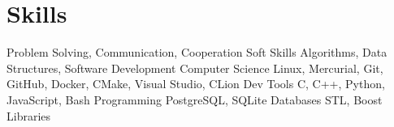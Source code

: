\section{Skills}

\begin{cventries}
    \cventryii
        {Problem Solving, Communication, Cooperation}
        {Soft Skills}
    \cventryii
        {Algorithms, Data Structures, Software Development}
        {Computer Science}
    \cventryii
        {Linux, Mercurial, Git, GitHub, Docker, CMake, Visual Studio, CLion}
        {Dev Tools}
    \cventryii
        {C, C++, Python, JavaScript, Bash}
        {Programming}
    \cventryii
        {PostgreSQL, SQLite}
        {Databases}
    \cventryii
        {STL, Boost}
        {Libraries}
\end{cventries}
